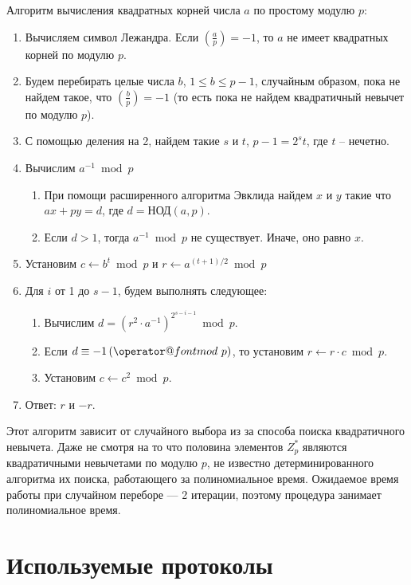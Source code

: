 \documentclass[12pt,a4paper]{report}
\makeatletter
\def\imod#1{\allowbreak\,({\operator@font mod}\ #1)}
\def \jacobi #1#2{\left(\frac{#1}{#2}\right)}
\makeatother
\begin{document}
Алгоритм вычисления квадратных корней числа $a$ по простому модулю $p$:

\begin{enumerate}
\item Вычисляем символ Лежандра. Если $\jacobi{a}{p} = -1$, то $a$ не имеет
квадратных корней по модулю $p$.
\item Будем перебирать целые числа $b$, $1 \leq b \leq p - 1$, случайным
образом, пока не найдем такое, что $\jacobi{b}{p} = -1$ (то есть пока не 
найдем квадратичный невычет по модулю $p$).
\item С помощью деления на 2, найдем такие $s$ и $t$, $p - 1 = 2^{s}t$, где
$t$ -- нечетно.
\item Вычислим $a^{-1}\bmod{p}$
\begin{enumerate}
\item При помощи расширенного алгоритма Эвклида найдем $x$ и $y$ такие что $ax + py = d$, где $d = \textrm{НОД}(a, p)$.
\item Если $d > 1$, тогда $a^{-1}\bmod{p}$ не существует. Иначе, оно равно $x$.
\end{enumerate}
\item Установим $c \leftarrow b^t \bmod{p}$ и $r \leftarrow a^{(t+1)/2} \bmod{p}$
\item Для $i$ от 1 до $s - 1$, будем выполнять следующее:
\begin{enumerate}
\item Вычислим $d = (r^2 \cdot a^{-1})^{2^{s - i -1}} \bmod{p}$.
\item Если $d \equiv -1 \imod{p}$, то установим $r \leftarrow r \cdot c \bmod{p}$.
\item Установим $c \leftarrow c^2 \bmod{p}$.
\end{enumerate}
\item Ответ: $r$ и $-r$.
\end{enumerate}

Этот алгоритм зависит от случайного выбора из за способа поиска квадратичного
невычета. Даже не смотря на то что половина элементов $Z^*_p$ являются
квадратичными невычетами по модулю $p$, не известно детерминированного
алгоритма их поиска, работающего за полиномиальное время. Ожидаемое время 
работы при случайном переборе --- 2 итерации, поэтому процедура занимает
полиномиальное время.


\chapter{Используемые протоколы}
\end{document}

